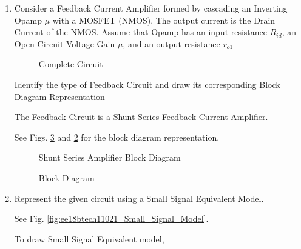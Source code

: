 \begin{enumerate}[label=\thesection.\arabic*.,ref=\thesection.\theenumi]
\item
Consider a Feedback Current Amplifier formed by cascading an Inverting Opamp $\mu$ with a MOSFET (NMOS).
The output current is the Drain Current of the NMOS.
Assume that Opamp has an input resistance $R_{id}$, an Open Circuit Voltage Gain $\mu$, and an output resistance $r_{o1}$

\renewcommand{\thefigure}{\theenumi.\arabic{figure}}
\begin{figure}[!ht]
	\begin{center}
		\resizebox{\columnwidth}{!}{}
	\end{center}
\caption{Complete Circuit}
\label{fig:ee18btech11021_Complete_Circuit}
\end{figure}
%
Identify the type of Feedback Circuit and draw its corresponding Block Diagram Representation

\solution
The Feedback Circuit is a Shunt-Series Feedback Current Amplifier.

See Figs. \ref{fig:ee18btech11021_Block_Diagram}
 and \ref{fig:ee18btech11021_Shunt_Series_Block_Diagram} for the block diagram representation.

\begin{figure}[!ht]
	\begin{center}
		\resizebox{\columnwidth}{!}{}
	\end{center}
\caption{Shunt Series Amplifier Block Diagram}
\label{fig:ee18btech11021_Shunt_Series_Block_Diagram}
\end{figure}

\begin{figure}[!ht]
	\begin{center}
			\resizebox{\columnwidth}{!}{}
	\end{center}
\caption{Block Diagram}
\label{fig:ee18btech11021_Block_Diagram}
\end{figure}
\renewcommand{\thefigure}{\theenumi}

\item
Represent the given circuit using a Small Signal Equivalent Model.

\solution See Fig. \ref{fig:ee18btech11021_Small_Signal_Model}.

To draw Small Signal Equivalent model,


\end{enumerate}
